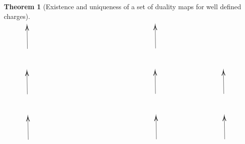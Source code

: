 \documentclass[a4paper,12pt]{article}
\newtheorem{Theorem}{Theorem}[section]
\begin{document}
\begin{Theorem}[Existence and uniqueness of a set of duality maps for well defined charges]
\begin{equation}
\begin{tikzpicture}[x=0.62pt,y=0.75pt,yscale=-1,xscale=1]
\draw    (427.14,353.04) -- (426.24,309.83) ;
\draw [shift={(426.2,307.83)}, rotate = 88.81] [color={rgb, 255:red, 0; green, 0; blue, 0 }  ][line width=0.75]    (10.93,-3.29) .. controls (6.95,-1.4) and (3.31,-0.3) .. (0,0) .. controls (3.31,0.3) and (6.95,1.4) .. (10.93,3.29)   ;
\draw    (424.94,263.49) -- (424.04,220.28) ;
\draw [shift={(424,218.28)}, rotate = 88.81] [color={rgb, 255:red, 0; green, 0; blue, 0 }  ][line width=0.75]    (10.93,-3.29) .. controls (6.95,-1.4) and (3.31,-0.3) .. (0,0) .. controls (3.31,0.3) and (6.95,1.4) .. (10.93,3.29)   ;
\draw    (425.19,173.93) -- (424.29,130.72) ;
\draw [shift={(424.25,128.72)}, rotate = 88.81] [color={rgb, 255:red, 0; green, 0; blue, 0 }  ][line width=0.75]    (10.93,-3.29) .. controls (6.95,-1.4) and (3.31,-0.3) .. (0,0) .. controls (3.31,0.3) and (6.95,1.4) .. (10.93,3.29)   ;
\draw    (121.75,353.91) -- (120.86,310.7) ;
\draw [shift={(120.81,308.7)}, rotate = 88.81] [color={rgb, 255:red, 0; green, 0; blue, 0 }  ][line width=0.75]    (10.93,-3.29) .. controls (6.95,-1.4) and (3.31,-0.3) .. (0,0) .. controls (3.31,0.3) and (6.95,1.4) .. (10.93,3.29)   ;
\draw    (119.55,264.36) -- (118.66,221.15) ;
\draw [shift={(118.61,219.15)}, rotate = 88.81] [color={rgb, 255:red, 0; green, 0; blue, 0 }  ][line width=0.75]    (10.93,-3.29) .. controls (6.95,-1.4) and (3.31,-0.3) .. (0,0) .. controls (3.31,0.3) and (6.95,1.4) .. (10.93,3.29)   ;
\draw    (119.8,174.8) -- (118.9,131.59) ;
\draw [shift={(118.86,129.59)}, rotate = 88.81] [color={rgb, 255:red, 0; green, 0; blue, 0 }  ][line width=0.75]    (10.93,-3.29) .. controls (6.95,-1.4) and (3.31,-0.3) .. (0,0) .. controls (3.31,0.3) and (6.95,1.4) .. (10.93,3.29)   ;
\draw    (589.89,353.04) -- (588.99,309.83) ;
\draw [shift={(588.95,307.83)}, rotate = 88.81] [color={rgb, 255:red, 0; green, 0; blue, 0 }  ][line width=0.75]    (10.93,-3.29) .. controls (6.95,-1.4) and (3.31,-0.3) .. (0,0) .. controls (3.31,0.3) and (6.95,1.4) .. (10.93,3.29)   ;
\draw    (587.69,263.49) -- (586.79,220.28) ;
\draw [shift={(586.75,218.28)}, rotate = 88.81] [color={rgb, 255:red, 0; green, 0; blue, 0 }  ][line width=0.75]    (10.93,-3.29) .. controls (6.95,-1.4) and (3.31,-0.3) .. (0,0) .. controls (3.31,0.3) and (6.95,1.4) .. (10.93,3.29)   ;

\end{tikzpicture}
\end{equation}
\end{Theorem}
\end{document}
